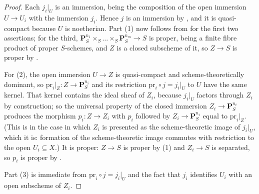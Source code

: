 \begin{proof}
\leanok
Each $j_i|_U$ is an immersion, being the composition of the open immersion
$U\to U_i$ with the immersion $j_i$.  Hence $j$ is an immersion by
, and it is quasi-compact because $U$ is
noetherian.  Part (1) now follows from  for the first two
assertions; for the third, $\mathbf P^{n_1}_S\times_S\dots\times_S
\mathbf P^{n_m}_S\to S$ is proper, being a finite fibre product of proper
$S$-schemes, and $Z$ is a closed subscheme of it, so $Z\to S$ is proper by
.

For (2), the open immersion $U\to Z$ is quasi-compact and scheme-theoretically
dominant, so $\mathrm{pr}_i|_Z\colon Z\to\mathbf P^{n_i}_S$ and its restriction
$\mathrm{pr}_i\circ j=j_i|_U$ to $U$ have the same kernel.  That kernel
contains the ideal sheaf of $Z_i$, because $j_i|_U$ factors through $Z_i$ by
construction; so the universal property of the closed immersion
$Z_i\to\mathbf P^{n_i}_S$ produces the morphism $p_i\colon Z\to Z_i$ with
$p_i$ followed by $Z_i\to\mathbf P^{n_i}_S$ equal to $\mathrm{pr}_i|_Z$.  (This
is  in the case in which $Z_i$ is presented as the
scheme-theoretic image of $j_i|_U$, which it is: formation of the
scheme-theoretic image commutes with restriction to the open $U_i\subseteq X$.)
It is proper: $Z\to S$ is proper by (1) and $Z_i\to S$ is separated, so $p_i$
is proper by .

Part (3) is immediate from $\mathrm{pr}_i\circ j=j_i|_U$ and the fact that
$j_i$ identifies $U_i$ with an open subscheme of $Z_i$.
\end{proof}

